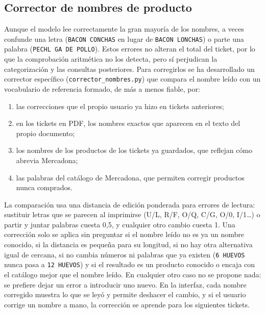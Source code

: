 \subsection{Corrector de nombres de producto}
\label{s:corrector}
Aunque el modelo lee correctamente la gran mayoría de los nombres, a veces confunde una letra (\texttt{BACON CONCHAS} en lugar de \texttt{BACON LONCHAS}) o parte una palabra (\texttt{PECHL GA DE POLLO}). Estos errores no alteran el total del ticket, por lo que la comprobación aritmética no los detecta, pero sí perjudican la categorización y las consultas posteriores. Para corregirlos se ha desarrollado un corrector específico (\texttt{corrector\_nombres.py}) que compara el nombre leído con un vocabulario de referencia formado, de más a menos fiable, por:

\begin{enumerate}
    \item las correcciones que el propio usuario ya hizo en tickets anteriores;
    \item en los tickets en PDF, los nombres exactos que aparecen en el texto del propio documento;
    \item los nombres de los productos de los tickets ya guardados, que reflejan cómo abrevia Mercadona;
    \item las palabras del catálogo de Mercadona, que permiten corregir productos nunca comprados.
\end{enumerate}

La comparación usa una distancia de edición \parencite{levenshtein1966binary} ponderada para errores de lectura: sustituir letras que se parecen al imprimirse (U/L, R/F, O/Q, C/G, O/0, I/1\ldots) o partir y juntar palabras cuesta 0,5, y cualquier otro cambio cuesta 1. Una corrección solo se aplica sin preguntar si el nombre leído no es ya un nombre conocido, si la distancia es pequeña para su longitud, si no hay otra alternativa igual de cercana, si no cambia números ni palabras que ya existen (\texttt{6 HUEVOS} nunca pasa a \texttt{12 HUEVOS}) y si el resultado es un producto conocido o encaja con el catálogo mejor que el nombre leído. En cualquier otro caso no se propone nada: se prefiere dejar un error a introducir uno nuevo. En la interfaz, cada nombre corregido muestra lo que se leyó y permite deshacer el cambio, y si el usuario corrige un nombre a mano, la corrección se aprende para los siguientes tickets.

